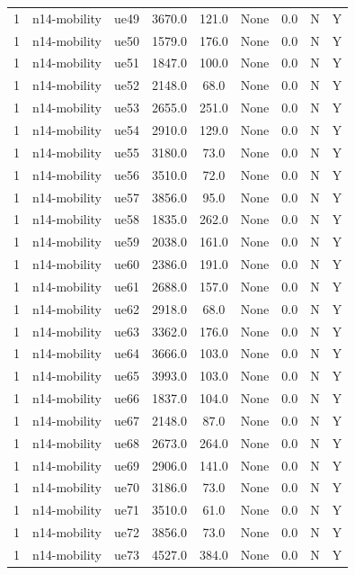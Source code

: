 \begin{table}[ht]
\begin{tabular}{|c|c|c|c|c|c|c|c|c|}
1 & n14-mobility & ue49 & 3670.0 & 121.0 & None & 0.0 & N & Y \\
1 & n14-mobility & ue50 & 1579.0 & 176.0 & None & 0.0 & N & Y \\
1 & n14-mobility & ue51 & 1847.0 & 100.0 & None & 0.0 & N & Y \\
1 & n14-mobility & ue52 & 2148.0 & 68.0 & None & 0.0 & N & Y \\
1 & n14-mobility & ue53 & 2655.0 & 251.0 & None & 0.0 & N & Y \\
1 & n14-mobility & ue54 & 2910.0 & 129.0 & None & 0.0 & N & Y \\
1 & n14-mobility & ue55 & 3180.0 & 73.0 & None & 0.0 & N & Y \\
1 & n14-mobility & ue56 & 3510.0 & 72.0 & None & 0.0 & N & Y \\
1 & n14-mobility & ue57 & 3856.0 & 95.0 & None & 0.0 & N & Y \\
1 & n14-mobility & ue58 & 1835.0 & 262.0 & None & 0.0 & N & Y \\
1 & n14-mobility & ue59 & 2038.0 & 161.0 & None & 0.0 & N & Y \\
1 & n14-mobility & ue60 & 2386.0 & 191.0 & None & 0.0 & N & Y \\
1 & n14-mobility & ue61 & 2688.0 & 157.0 & None & 0.0 & N & Y \\
1 & n14-mobility & ue62 & 2918.0 & 68.0 & None & 0.0 & N & Y \\
1 & n14-mobility & ue63 & 3362.0 & 176.0 & None & 0.0 & N & Y \\
1 & n14-mobility & ue64 & 3666.0 & 103.0 & None & 0.0 & N & Y \\
1 & n14-mobility & ue65 & 3993.0 & 103.0 & None & 0.0 & N & Y \\
1 & n14-mobility & ue66 & 1837.0 & 104.0 & None & 0.0 & N & Y \\
1 & n14-mobility & ue67 & 2148.0 & 87.0 & None & 0.0 & N & Y \\
1 & n14-mobility & ue68 & 2673.0 & 264.0 & None & 0.0 & N & Y \\
1 & n14-mobility & ue69 & 2906.0 & 141.0 & None & 0.0 & N & Y \\
1 & n14-mobility & ue70 & 3186.0 & 73.0 & None & 0.0 & N & Y \\
1 & n14-mobility & ue71 & 3510.0 & 61.0 & None & 0.0 & N & Y \\
1 & n14-mobility & ue72 & 3856.0 & 73.0 & None & 0.0 & N & Y \\
1 & n14-mobility & ue73 & 4527.0 & 384.0 & None & 0.0 & N & Y \\

\end{tabular}
\end{table}
